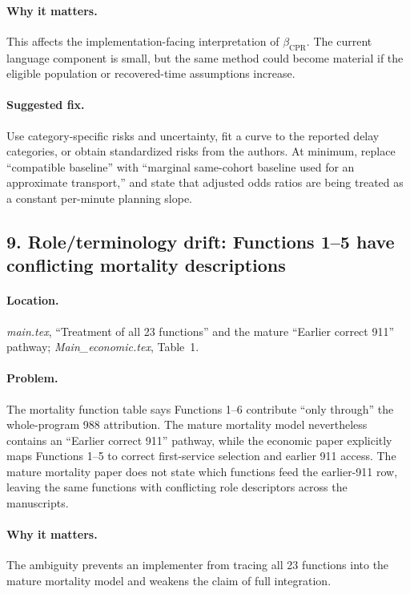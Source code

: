 \documentclass[11pt]{article}
\begin{document}
\paragraph{Why it matters.}
This affects the implementation-facing interpretation of
\(\beta_{\mathrm{CPR}}\).  The current language component is small, but the same
method could become material if the eligible population or recovered-time
assumptions increase.

\paragraph{Suggested fix.}
Use category-specific risks and uncertainty, fit a curve to the reported delay
categories, or obtain standardized risks from the authors.  At minimum, replace
``compatible baseline'' with ``marginal same-cohort baseline used for an
approximate transport,'' and state that adjusted odds ratios are being treated
as a constant per-minute planning slope.

\subsection*{9. Role/terminology drift: Functions 1--5 have conflicting mortality descriptions}

\paragraph{Location.}
\emph{main.tex}, ``Treatment of all 23 functions'' and the mature ``Earlier
correct 911'' pathway; \emph{Main\_economic.tex}, Table~1.

\paragraph{Problem.}
The mortality function table says Functions 1--6 contribute ``only through''
the whole-program 988 attribution.  The mature mortality model nevertheless
contains an ``Earlier correct 911'' pathway, while the economic paper explicitly
maps Functions 1--5 to correct first-service selection and earlier 911 access.
The mature mortality paper does not state which functions feed the earlier-911
row, leaving the same functions with conflicting role descriptors across the
manuscripts.

\paragraph{Why it matters.}
The ambiguity prevents an implementer from tracing all 23 functions into the
mature mortality model and weakens the claim of full integration.
\end{document}
